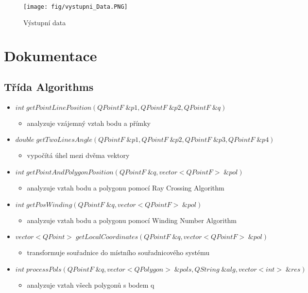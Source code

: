 \documentclass[oneside,12pt,a4paper]{book}
\begin{document}
\begin{figure}[ht!]
    \centering
    \texttt{[image: fig/vystupni\_Data.PNG]}
    \caption{Výstupní data}
    \label{fig:Zadání úlohy}
\end{figure}




\chapter{Dokumentace} 
\section{Třída Algorithms}
    \begin{itemize}
    \item $int \;getPointLinePosition(QPointF \; \&p1, QPointF \;\&p2, QPointF \;\&q)$
    \begin{itemize}
    \item analyzuje vzájemný vztah bodu a přímky
    \end{itemize}
    \item $double\; getTwoLinesAngle(QPointF \; \&p1,QPointF \; \&p2,QPointF \; \&p3,QPointF \; \&p4)$
        \begin{itemize}
    \item vypočítá úhel mezi dvěma vektory
    \end{itemize}
    \item $int\; getPointAndPolygonPosition(QPointF \; \&q, vector<QPointF> \; \&pol)$
        \begin{itemize}
    \item analyzuje vztah bodu a polygonu pomocí Ray Crossing Algorithm
    \end{itemize}
    \item $int\; getPosWinding(QPointF \; \&q, vector<QPointF> \; \&pol) $
        \begin{itemize}
    \item analyzuje vztah bodu a polygonu pomocí Winding Number Algorithm
    \end{itemize}
    \item $vector<QPoint> \; getLocalCoordinates(QPointF \; \&q, vector<QPointF> \; \&pol)$
        \begin{itemize}
    \item transformuje souřadnice do místního souřadnicového systému
    \end{itemize}
    \item $int\; processPols(QPointF \; \&q, vector<QPolygon> \; \&pols, QString \; \&alg, vector<int> \; \&res)$
        \begin{itemize}
    \item analyzuje vztah všech polygonů s bodem  q
    \end{itemize}
    
\end{itemize}
\end{document}
